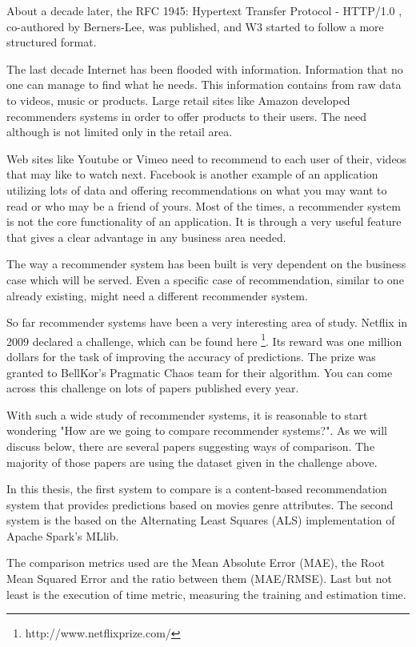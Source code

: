 About a decade later, the RFC 1945: Hypertext Transfer Protocol - HTTP/1.0 \cite{berners1997rfc}, co-authored by Berners-Lee, was published, and W3 started to follow a more structured format.

The last decade Internet has been flooded with information. Information that no one can manage to find what he needs. This information contains from raw data to videos, music or products. Large retail sites like Amazon developed recommenders systems in order to offer products to their users. The need although is not limited only in the retail area. 

Web sites like Youtube or Vimeo need to recommend to each user of their, videos that may like to watch next. Facebook is another example of an application utilizing lots of data and offering recommendations on what you may want to read or who may be a friend of yours. Most of the times, a recommender system is not the core functionality of an application. It is through a very useful feature that gives a clear advantage in any business area needed.

The way a recommender system has been built is very dependent on the business case which will be served. Even a specific case of recommendation, similar to one already existing, might need a different recommender system.

So far recommender systems have been a very interesting area of study. Netflix in 2009 declared a challenge, which can be found here \footnote{http://www.netflixprize.com/}. Its reward was one million dollars for the task of improving the accuracy of predictions. The prize was granted to BellKor’s Pragmatic Chaos team for their algorithm. You can come across this challenge on lots of papers published every year.

With such a wide study of recommender systems, it is reasonable to start wondering "How are we going to compare recommender systems?". As we will discuss below, there are several papers suggesting ways of comparison. The majority of those papers are using the dataset given in the challenge above.

In this thesis, the first system to compare is a content-based recommendation system that provides predictions based on movies genre attributes. The second system is the based on the Alternating Least Squares (ALS) implementation of Apache Spark's MLlib.

The comparison metrics used are the Mean Absolute Error (MAE), the Root Mean Squared Error and the ratio between them (MAE/RMSE). Last but not least is the execution of time metric, measuring the training and estimation time.

